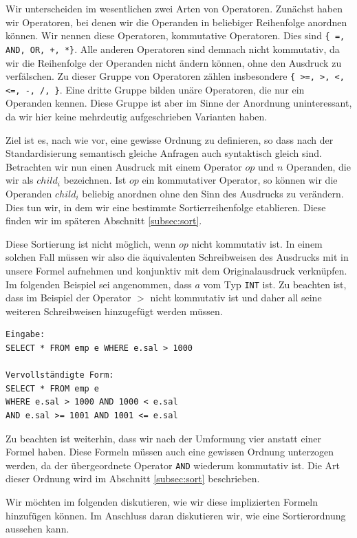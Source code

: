 Wir unterscheiden im wesentlichen zwei Arten von Operatoren. Zunächst haben wir Operatoren, bei denen wir die Operanden in beliebiger Reihenfolge anordnen können. Wir nennen diese Operatoren, kommutative Operatoren. Dies sind \verb|{ =, AND, OR, +, *}|. Alle anderen Operatoren sind demnach nicht kommutativ, da wir die Reihenfolge der Operanden nicht ändern können, ohne den Ausdruck zu verfälschen. Zu dieser Gruppe von Operatoren zählen insbesondere \verb|{ >=, >, <, <=, -, /, }|. Eine dritte Gruppe bilden unäre Operatoren, die nur ein Operanden kennen. Diese Gruppe ist aber im Sinne der Anordnung uninteressant, da wir hier keine mehrdeutig aufgeschrieben Varianten haben.

Ziel ist es, nach wie vor, eine gewisse Ordnung zu definieren, so dass nach der Standardisierung semantisch gleiche Anfragen auch syntaktisch gleich sind. Betrachten wir nun einen Ausdruck mit einem Operator $op$ und $n$ Operanden, die wir als $child_i$ bezeichnen. Ist $op$ ein kommutativer Operator, so können wir die Operanden $child_i$ beliebig anordnen ohne den Sinn des Ausdrucks zu verändern. Dies tun wir, in dem wir eine bestimmte Sortierreihenfolge etablieren. Diese finden wir im späteren Abschnitt \ref{subsec:sort}.

Diese Sortierung ist nicht möglich, wenn $op$ nicht kommutativ ist. In einem solchen Fall müssen wir also die äquivalenten Schreibweisen des Ausdrucks mit in unsere Formel aufnehmen und konjunktiv mit dem Originalausdruck verknüpfen. Im folgenden Beispiel sei angenommen, dass $a$ vom Typ \verb|INT| ist.
Zu beachten ist, dass im Beispiel der Operator $>$ nicht kommutativ ist und daher all seine weiteren Schreibweisen hinzugefügt werden müssen.

\begin{verbatim}
Eingabe:
SELECT * FROM emp e WHERE e.sal > 1000

Vervollständigte Form:
SELECT * FROM emp e 
WHERE e.sal > 1000 AND 1000 < e.sal 
AND e.sal >= 1001 AND 1001 <= e.sal
\end{verbatim}

Zu beachten ist weiterhin, dass wir nach der Umformung vier anstatt einer Formel haben. Diese Formeln müssen auch eine gewissen Ordnung unterzogen werden, da der übergeordnete Operator \verb|AND| wiederum kommutativ ist. Die Art dieser Ordnung wird im Abschnitt \ref{subsec:sort} beschrieben.

Wir möchten im folgenden diskutieren, wie wir diese implizierten Formeln hinzufügen können. Im Anschluss daran diskutieren wir, wie eine Sortierordnung aussehen kann.

